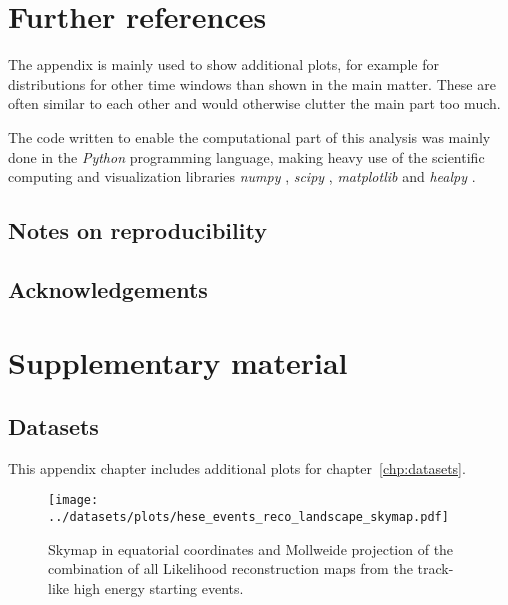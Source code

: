 \chapter{Further references}
The appendix is mainly used to show additional plots, for example for distributions for other time windows than shown in the main matter.
These are often similar to each other and would otherwise clutter the main part too much.

The code written to enable the computational part of this analysis was mainly done in the \emph{Python} programming language, making heavy use of the scientific computing and visualization libraries \emph{numpy} \cite{numpy}, \emph{scipy} \cite{scipy}, \emph{matplotlib} \cite{matplotlib} and \emph{healpy} \cite{Gorski:2004by}.

\section{Notes on reproducibility}

\section{Acknowledgements}


\chapter{Supplementary material}
\section{Datasets}
This appendix chapter includes additional plots for chapter~\ref{chp:datasets}.

\begin{figure}[htbp]
  \centering
  \texttt{[image: ../datasets/plots/hese\_events\_reco\_landscape\_skymap.pdf]}
  \caption[Combined Likelihood skymap of the 22 HESEs]{
    Skymap in equatorial coordinates and Mollweide projection of the combination of all Likelihood reconstruction maps from the track-like high energy starting events.
  }
  \label{fig:hese_events_reco_landscape_skymap}
\end{figure}


